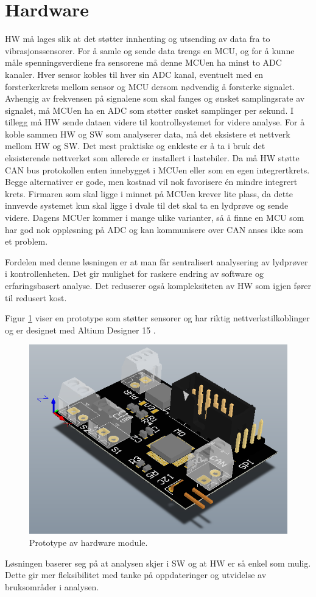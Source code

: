 \section{Hardware}

HW må lages slik at det støtter innhenting og utsending av data fra to vibrasjonssensorer. 
For å samle og sende data trengs en MCU, og for å kunne måle spenningsverdiene fra sensorene
må denne MCUen ha minst to ADC kanaler. Hver sensor kobles til hver sin ADC kanal, eventuelt
med en forsterkerkrets mellom sensor og MCU dersom nødvendig å forsterke signalet.
Avhengig av frekvensen på signalene som skal fanges og ønsket samplingsrate av signalet, må 
MCUen ha en ADC som støtter ønsket samplinger per sekund. I tillegg må HW sende dataen 
videre til kontrollsystemet for videre analyse. For å koble sammen HW og SW som analyserer data,
må det eksistere et nettverk mellom HW og SW. Det mest praktiske og enkleste er å ta i bruk det eksisterende
nettverket som allerede er installert i lastebiler. Da må HW støtte CAN bus protokollen enten innebygget
i MCUen eller som en egen integrertkrets. Begge alternativer er gode, men kostnad vil nok favorisere
én mindre integrert krets. Firmaren \cite{firmware} som skal ligge i minnet på MCUen krever lite plass, 
da dette innvevde systemet \cite{embedded} kun skal ligge i dvale til det skal ta en lydprøve og sende 
videre. Dagens MCUer kommer i mange
ulike varianter, så å finne en MCU som har god nok oppløsning på ADC og kan kommunisere over CAN anses ikke som et problem. 

Fordelen med denne løsningen er at man får sentralisert analysering av lydprøver i kontrollenheten.
Det gir mulighet for raskere endring av software og erfaringsbasert analyse. Det reduserer også kompleksiteten
av HW som igjen fører til redusert kost. 

Figur \ref{fig:hw} viser en prototype som støtter sensorer og har riktig nettverkstilkoblinger og er designet med
Altium Designer 15 \cite{altium}. 
\begin{figure}[H] \centering
\includegraphics[width=0.5 \textwidth]{images/eit_prototype.png}
\caption{Prototype av hardware module.}
\label{fig:hw}
\end{figure}
Løsningen baserer seg på at analysen skjer i SW og at HW er så enkel som mulig. Dette gir mer
fleksibilitet med tanke på oppdateringer og utvidelse av bruksområder i analysen.